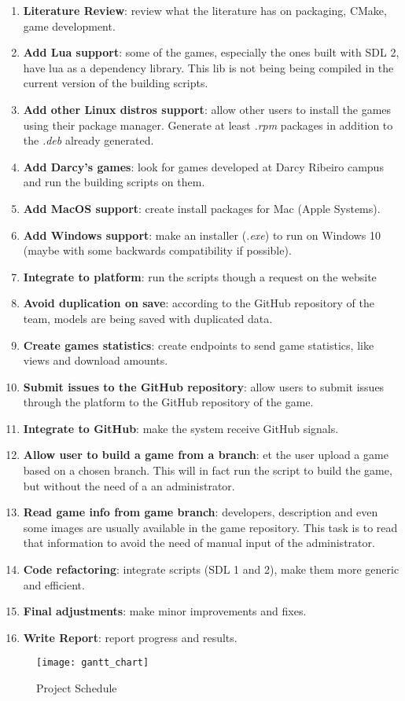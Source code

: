 \begin{enumerate}
\item \textbf{Literature Review}: review what the literature has on packaging, CMake, game development.
\item \textbf{Add Lua support}: some of the games, especially the ones built with SDL 2, have lua as a dependency library. This lib is not being being compiled in the current version of the building scripts.
\item \textbf{Add other Linux distros support}: allow other users to install the games using their package manager. Generate at least \textit{.rpm} packages in addition to the \textit{.deb} already generated.
\item \textbf{Add Darcy's games}: look for games developed at Darcy Ribeiro campus and run the building scripts on them.
\item \textbf{Add MacOS support}: create install packages for Mac (Apple Systems).
\item \textbf{Add Windows support}: make an installer (\textit{.exe}) to run on Windows 10 (maybe with some backwards compatibility if possible).
\item \textbf{Integrate to platform}: run the scripts though a request on the website
\item \textbf{Avoid duplication on save}: according to the GitHub repository of the team, models are being saved with duplicated data.
\item \textbf{Create games statistics}: create endpoints to send game statistics, like views and download amounts.
\item \textbf{Submit issues to the GitHub repository}: allow users to submit issues through the platform to the GitHub repository of the game.
\item \textbf{Integrate to GitHub}: make the system receive GitHub signals.
\item \textbf{Allow user to build a game from a branch}: et the user upload a game based on a chosen branch. This will in fact run the script to build the game, but without the need of a an administrator.
\item \textbf{Read game info from game branch}: developers, description and even some images are usually available in the game repository. This task is to read that information to avoid the need of manual input of the administrator.
\item \textbf{Code refactoring}: integrate scripts (SDL 1 and 2), make them more generic and efficient.
\item \textbf{Final adjustments}: make minor improvements and fixes.
\item \textbf{Write Report}: report progress and results.
\end{enumerate}

\begin{figure}[h!]
\centering
\texttt{[image: gantt\_chart]}
\caption{Project Schedule}
\label{fig:schedule}
\end{figure}
